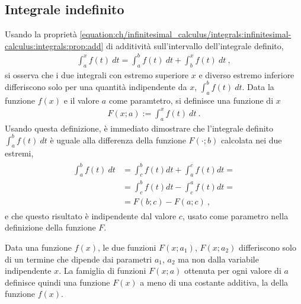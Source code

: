 \documentclass[letterpaper,10pt,italian]{jupyterBook}
\begin{document}
\subsection{Integrale indefinito}
\label{\detokenize{ch/infinitesimal_calculus/integrals:integrale-indefinito}}\label{\detokenize{ch/infinitesimal_calculus/integrals:infinitesimal-calculus-integrals-def-indefinite}}
\sphinxAtStartPar
Usando la proprietà \eqref{equation:ch/infinitesimal_calculus/integrals:infinitesimal-calculus:integrals:prop:add} di additività sull’intervallo dell’integrale definito,
\begin{equation*}
\begin{split}\int_a^x f(t) \ dt = \int_a^b f(t) \ dt + \int_b^x f(t) \ dt \ , \end{split}
\end{equation*}
\sphinxAtStartPar
si osserva che i due integrali con estremo superiore \(x\) e diverso estremo inferiore differiscono solo per una quantità indipendente da \(x\), \(\int_{a}^{b} f(t) \ dt\). Data la funzione \(f(x)\) e il valore \(a\) come paramtetro, si definisce una funzione di \(x\)
\begin{equation}\label{equation:ch/infinitesimal_calculus/integrals:infinitesimal-calculus:integrals:primi-}
\begin{split}F(x;a) := \int_a^x f(t) \ dt \ .\end{split}
\end{equation}
\sphinxAtStartPar
Usando questa definizione, è immediato dimostrare che l’integrale definito \(\int_{a}^{b} f(t) \ dt\) è uguale alla differenza della funzione \(F(\cdot; b)\) calcolata nei due estremi,
\begin{equation*}
\begin{split}\begin{aligned}
  \int_{a}^{b} f(t) \ dt & = \int_{c}^{b} f(t) dt + \int_{a}^{c} f(t) dt = \\ 
                         & = \int_{c}^{b} f(t) dt - \int_{c}^{a} f(t) dt = \\
                         & = F(b;c) - F(a;c) \ ,
\end{aligned}\end{split}
\end{equation*}
\sphinxAtStartPar
e che questo risultato è indipendente dal valore \(c\), usato come parametro nella definizione della funzione \(F\).

\sphinxAtStartPar
Data una funzione \(f(x)\), le due funzioni \(F(x;a_1)\), \(F(x;a_2)\) differiscono solo di un termine che dipende dai parametri \(a_1\), \(a_2\) ma non dalla variabile indipendente \(x\). La famiglia di funzioni \(F(x;a)\) ottenuta per ogni valore di \(a\) definisce quindi una funzione \(F(x)\) a meno di una costante additiva, la  della funzione \(f(x)\).
\end{document}
